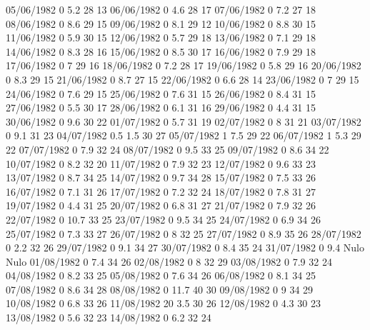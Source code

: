 05/06/1982  0      5.2    28     13 
06/06/1982  0      4.6    28     17 
07/06/1982  0      7.2    27     18 
08/06/1982  0      8.6    29     15 
09/06/1982  0      8.1    29     12 
10/06/1982  0      8.8    30     15 
11/06/1982  0      5.9    30     15 
12/06/1982  0      5.7    29     18 
13/06/1982  0      7.1    29     18 
14/06/1982  0      8.3    28     16 
15/06/1982  0      8.5    30     17 
16/06/1982  0      7.9    29     18 
17/06/1982  0      7      29     16 
18/06/1982  0      7.2    28     17 
19/06/1982  0      5.8    29     16 
20/06/1982  0      8.3    29     15 
21/06/1982  0      8.7    27     15 
22/06/1982  0      6.6    28     14 
23/06/1982  0      7      29     15 
24/06/1982  0      7.6    29     15 
25/06/1982  0      7.6    31     15 
26/06/1982  0      8.4    31     15 
27/06/1982  0      5.5    30     17 
28/06/1982  0      6.1    31     16 
29/06/1982  0      4.4    31     15 
30/06/1982  0      9.6    30     22 
01/07/1982  0      5.7    31     19 
02/07/1982  0      8      31     21 
03/07/1982  0      9.1    31     23 
04/07/1982  0.5    1.5    30     27 
05/07/1982  1      7.5    29     22 
06/07/1982  1      5.3    29     22 
07/07/1982  0      7.9    32     24 
08/07/1982  0      9.5    33     25 
09/07/1982  0      8.6    34     22 
10/07/1982  0      8.2    32     20 
11/07/1982  0      7.9    32     23 
12/07/1982  0      9.6    33     23 
13/07/1982  0      8.7    34     25 
14/07/1982  0      9.7    34     28 
15/07/1982  0      7.5    33     26 
16/07/1982  0      7.1    31     26 
17/07/1982  0      7.2    32     24 
18/07/1982  0      7.8    31     27 
19/07/1982  0      4.4    31     25 
20/07/1982  0      6.8    31     27 
21/07/1982  0      7.9    32     26 
22/07/1982  0      10.7   33     25 
23/07/1982  0      9.5    34     25 
24/07/1982  0      6.9    34     26 
25/07/1982  0      7.3    33     27 
26/07/1982  0      8      32     25 
27/07/1982  0      8.9    35     26 
28/07/1982  0      2.2    32     26 
29/07/1982  0      9.1    34     27 
30/07/1982  0      8.4    35     24 
31/07/1982  0      9.4   Nulo   Nulo
01/08/1982  0      7.4    34     26 
02/08/1982  0      8      32     29 
03/08/1982  0      7.9    32     24 
04/08/1982  0      8.2    33     25 
05/08/1982  0      7.6    34     26 
06/08/1982  0      8.1    34     25 
07/08/1982  0      8.6    34     28 
08/08/1982  0      11.7   40     30 
09/08/1982  0      9      34     29 
10/08/1982  0      6.8    33     26 
11/08/1982  20     3.5    30     26 
12/08/1982  0      4.3    30     23 
13/08/1982  0      5.6    32     23 
14/08/1982  0      6.2    32     24 
